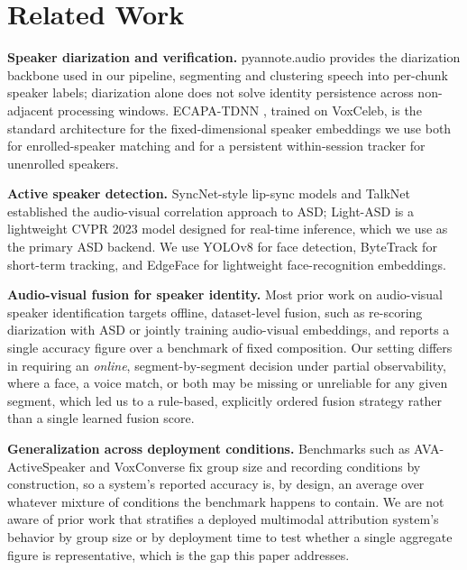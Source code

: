 \documentclass[conference,a4paper]{IEEEtran}
\begin{document}
\section{Related Work}

\textbf{Speaker diarization and verification.} pyannote.audio
\cite{bredin2020pyannote,bredin2023pyannote31} provides the diarization
backbone used in our pipeline, segmenting and clustering speech into
per-chunk speaker labels; diarization alone does not solve identity
persistence across non-adjacent processing windows. ECAPA-TDNN
\cite{desplanques2020ecapa}, trained on VoxCeleb, is the standard
architecture for the fixed-dimensional speaker embeddings we use both
for enrolled-speaker matching and for a persistent within-session
tracker for unenrolled speakers.

\textbf{Active speaker detection.} SyncNet-style lip-sync models
\cite{chung2017lipsync} and TalkNet \cite{tao2021talknet} established
the audio-visual correlation approach to ASD; Light-ASD
\cite{liao2023lightasd} is a lightweight CVPR 2023 model designed for
real-time inference, which we use as the primary ASD backend. We use
YOLOv8 \cite{jocher2023yolov8} for face detection, ByteTrack
\cite{zhang2022bytetrack} for short-term tracking, and EdgeFace
\cite{george2024edgeface} for lightweight face-recognition embeddings.

\textbf{Audio-visual fusion for speaker identity.} Most prior work on
audio-visual speaker identification targets offline, dataset-level
fusion, such as re-scoring diarization with ASD or jointly training
audio-visual embeddings, and reports a single accuracy figure over a
benchmark of fixed composition. Our setting differs in requiring an
\emph{online}, segment-by-segment decision under partial observability,
where a face, a voice match, or both may be missing or unreliable for
any given segment, which led us to a rule-based, explicitly ordered
fusion strategy rather than a single learned fusion score.

\textbf{Generalization across deployment conditions.} Benchmarks such
as AVA-ActiveSpeaker and VoxConverse fix group size and recording
conditions by construction, so a system's reported accuracy is, by
design, an average over whatever mixture of conditions the benchmark
happens to contain. We are not aware of prior work that stratifies a
deployed multimodal attribution system's behavior by group size or by
deployment time to test whether a single aggregate figure is
representative, which is the gap this paper addresses.
\end{document}
